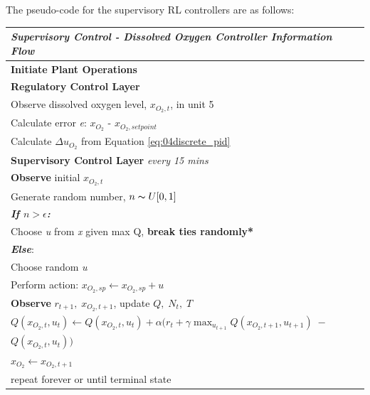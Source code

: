 The pseudo-code for the supervisory RL controllers are as follows:
\begin{table}[H]
	\begin{tabular}{p{14.5cm}}
	\hline
	\emph{Supervisory Control - Dissolved Oxygen Controller Information Flow} \\ \hline
	\textbf{Initiate Plant Operations} \\
	\hspace{0.75cm} \textbf{Regulatory Control Layer} \\
	\hspace{0.75cm} Observe dissolved oxygen level, $x_{O_2, t}$, in unit 5\\
	\hspace{0.75cm} Calculate error \emph{e}: $x_{O_2}$ - $x_{O_2, setpoint}$ \\
	\hspace{0.75cm} Calculate $\Delta u_{O_2}$ from Equation \ref{eq:04discrete_pid} \\
	\hspace{1.5cm} \textbf{Supervisory Control Layer} \emph{every 15 mins} \\
	\hspace{2.25cm} \textbf{Observe} initial $x_{O_2, t}$ \\
	\hspace{2.25cm} Generate random number, $n \thicksim U[0, 1]$ \\
    \hspace{2.25cm} \textbf{\emph{If $n > \epsilon$:}} \\ 
    \hspace{3cm} Choose \emph{u} from \emph{x} given max Q, \textbf{break ties randomly*} \\
    \hspace{2.25cm} \textbf{\emph{Else}}: \\
    \hspace{3cm} Choose random \emph{u} \\
	\hspace{2.25cm} Perform action: $x_{O_2, sp} \leftarrow x_{O_2, sp} + u$ \\
	\hspace{2.25cm} \textbf{Observe} $r_{t+1}, \; x_{O_2, t+1}$, update $Q, \; N_t, \; T$ \\
    \hspace{2.25cm} $Q(x_{O_2, t}, u_t) \leftarrow Q(x_{O_2, t}, u_t) + \alpha(r_t + \gamma \max_{u_{t+1}} Q(x_{O_2, t+1}, u_{t+1}) \; -$ \\ \hspace{5.5cm} $Q(x_{O_2, t}, u_t))$ \\
	\hspace{2.25cm} $x_{O_2} \leftarrow x_{O_2, t+1}$ \\
	\hspace{0.75cm} repeat forever or until terminal state \\
	\hline
	\end{tabular}
\end{table}

